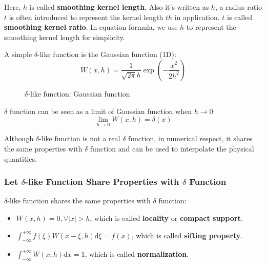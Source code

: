 Here, $h$ is called \textbf{smoothing kernel length}. 
Also it's written as $h$, 
a radius ratio $t$ is often introduced to represent the kernel length $t h$ in application.
$t$ is called \textbf{smoothing kernel ratio}.
In equation formula, we use $h$ to represent the smoothing kernel length for simplicity.

A simple $\delta$-like function is the Gaussian function (1D):
\begin{equation}
    W(x,h) = \frac{1}{\sqrt{2\pi}h} \exp\left(-\frac{x^2}{2h^2}\right)
\end{equation}

\begin{figure}[H]
    \centering
    \caption{$\delta$-like function: Gaussian function}
    \label{fig:delta_like_function_gaussian}
\end{figure}

$\delta$ function can be seen as a limit of Gaussian function when $h \rightarrow 0$:
\begin{equation}
    \lim_{h \rightarrow 0} W(x,h) = \delta(x)
\end{equation}

Although $\delta$-like function is not a real $\delta$ function, 
in numerical respect, 
it shares the same properties with $\delta$ function and can be used to interpolate the physical quantities.

\subsubsection{Let $\delta$-like Function Share Properties with $\delta$ Function}

$\delta$-like function shares the same properties with $\delta$ function:
\begin{itemize}
    \item $W(x,h) = 0, \forall |x| > h$, which is called \textbf{locality} or \textbf{compact support}.
    \item $\int_{-\infty}^{+\infty} f(\xi) W(x - \xi,h)\mathrm{d}\xi = f(x)$, which is called \textbf{sifting property}.
    \item $\int_{-\infty}^{+\infty} W(x,h) \mathrm{d}x = 1$, which is called \textbf{normalization}.
\end{itemize}

